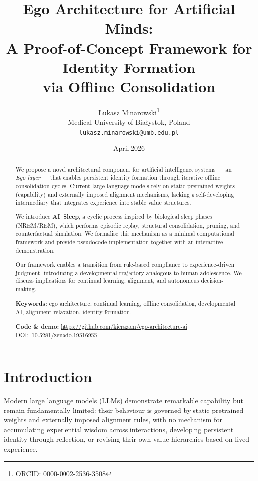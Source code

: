 \documentclass[11pt,a4paper]{article}
\title{%
  Ego Architecture for Artificial Minds:\\
  A Proof-of-Concept Framework for Identity Formation\\
  via Offline Consolidation
}
\author{
  \L ukasz Minarowski\thanks{ORCID: 0000-0002-2536-3508}\\
  Medical University of Bia\l ystok, Poland\\
  \texttt{lukasz.minarowski@umb.edu.pl}
}
\date{April 2026}
\begin{document}
\maketitle

\begin{abstract}
We propose a novel architectural component for artificial intelligence
systems --- an \emph{Ego layer} --- that enables persistent identity
formation through iterative offline consolidation cycles.  Current large
language models rely on static pretrained weights (capability) and
externally imposed alignment mechanisms, lacking a self-developing
intermediary that integrates experience into stable value structures.

We introduce \textbf{AI~Sleep}, a cyclic process inspired by biological
sleep phases (NREM/REM), which performs episodic replay, structural
consolidation, pruning, and counterfactual simulation.  We formalise
this mechanism as a minimal computational framework and provide
pseudocode implementation together with an interactive demonstration.

Our framework enables a transition from rule-based compliance to
experience-driven judgment, introducing a developmental trajectory
analogous to human adolescence.  We discuss implications for continual
learning, alignment, and autonomous decision-making.

\smallskip\noindent
\textbf{Keywords:} ego architecture, continual learning, offline
consolidation, developmental AI, alignment relaxation, identity
formation.

\smallskip\noindent
\textbf{Code \& demo:}
\url{https://github.com/kicrazom/ego-architecture-ai}\quad
DOI:~\href{https://doi.org/10.5281/zenodo.19516955}{10.5281/zenodo.19516955}
\end{abstract}

\section{Introduction}
\label{sec:intro}

Modern large language models (LLMs) demonstrate remarkable capability
but remain fundamentally limited: their behaviour is governed by static
pretrained weights and externally imposed alignment rules, with no
mechanism for accumulating experiential wisdom across interactions,
developing persistent identity through reflection, or revising their own
value hierarchies based on lived experience.
\end{document}
